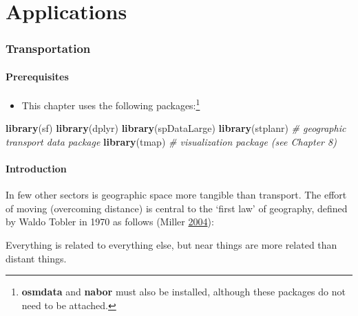 \documentclass[]{krantz}
\newenvironment{Shaded}{\begin{snugshade}}{\end{snugshade}}
\newcommand{\CommentTok}[1]{\textcolor[rgb]{0.37,0.37,0.37}{\textit{#1}}}
\newcommand{\KeywordTok}[1]{\textcolor[rgb]{0.27,0.27,0.27}{\textbf{#1}}}
\newcommand{\NormalTok}[1]{#1}
\providecommand{\tightlist}{%
  \setlength{\itemsep}{0pt}\setlength{\parskip}{0pt}}
\let\rmarkdownfootnote\footnote%
\def\footnote{\protect\rmarkdownfootnote}
\renewenvironment{quote}{\begin{VF}}{\end{VF}}
\begin{document}
\hypertarget{part-applications}{%
\part{Applications}\label{part-applications}}

\hypertarget{transport}{%
\section{Transportation}\label{transport}}

\hypertarget{prerequisites-10}{%
\subsection*{Prerequisites}\label{prerequisites-10}}

\begin{itemize}
\tightlist
\item
  This chapter uses the following packages:\footnote{\textbf{osmdata} and \textbf{nabor} must also be installed, although these packages do not need to be attached.}
\end{itemize}

\begin{Shaded}
\begin{Highlighting}[]
\KeywordTok{library}\NormalTok{(sf)}
\KeywordTok{library}\NormalTok{(dplyr)}
\KeywordTok{library}\NormalTok{(spDataLarge)}
\KeywordTok{library}\NormalTok{(stplanr)      }\CommentTok{# geographic transport data package}
\KeywordTok{library}\NormalTok{(tmap)         }\CommentTok{# visualization package (see Chapter 8)}
\end{Highlighting}
\end{Shaded}

\hypertarget{introduction-7}{%
\subsection{Introduction}\label{introduction-7}}

In few other sectors is geographic space more tangible than transport.
The effort of moving (overcoming distance) is central to the `first law' of geography, defined by Waldo Tobler in 1970 as follows (Miller \protect\hyperlink{ref-miller_tobler_2004}{2004}):

\begin{quote}
Everything is related to everything else, but near things are more related than distant things.
\end{quote}
\end{document}
